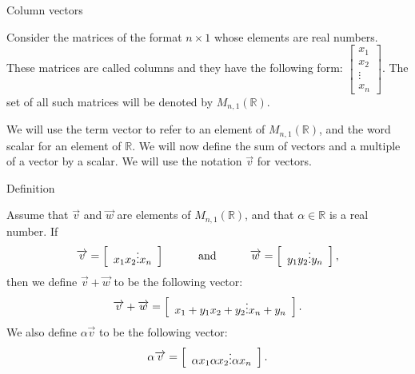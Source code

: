 Column vectors

Consider the matrices of the format \( n\times 1 \) whose elements are real numbers. These matrices are called columns and they have the following form: \( \left[\begin{array}{c}x_1\\ x_2\\ \vdots \\ x_n\end{array}\right] \). The set of all such matrices will be denoted by \( M_{n,1}(\mathbb R) \).

We will use the term vector to refer to an element of \( M_{n,1}(\mathbb R) \), and the word scalar for an element of \( \mathbb R \). We will now define the sum of vectors and a multiple of a vector by a scalar. We will use the notation \( \overrightarrow{v} \) for vectors.

Definition

Assume that \( \overrightarrow v \) and \( \overrightarrow w \) are elements of \( M_{n,1}(\mathbb R) \), and that \( \alpha\in \mathbb R \) is a real number. If \begin{eqnarray*} \overrightarrow v=\left[\begin{array}{c}x_1\newline x_2\newline \vdots \newline x_n\end{array}\right] \quad\quad\quad\mbox{and}\quad\quad\quad \overrightarrow w=\left[\begin{array}{c}y_1\newline y_2\newline \vdots \newline y_n\end{array}\right], \end{eqnarray*} then we define \( \overrightarrow v+\overrightarrow w \) to be the following vector: \begin{eqnarray*} \overrightarrow v+\overrightarrow w=\left[\begin{array}{c}x_1+y_1\newline x_2+y_2\newline \vdots \newline x_n+y_n\end{array}\right]. \end{eqnarray*} We also define \( \alpha\overrightarrow v \) to be the following vector: \begin{eqnarray*} \alpha \overrightarrow v=\left[\begin{array}{c}\alpha x_1\newline \alpha x_2\newline \vdots \newline \alpha x_n\end{array}\right]. \end{eqnarray*}

